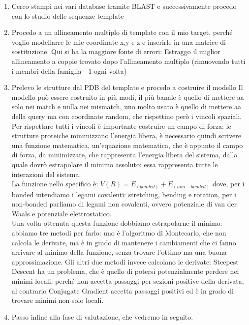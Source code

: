 \documentclass{article}
\begin{document}
\begin{enumerate}
    \item Cerco stampi nei vari database tramite BLAST e successivamente procedo con lo studio delle sequenze template
    \item Procedo a un allineamento multiplo di template con il mio target, perché voglio modellarre le mie coordinate x,y e z e inserirle in una matrice di sostituzione. Qui si ha la maggiore fonte di errori:
    Estraggo il miglior allineamento a coppie trovato dopo l'allineamento multiplo (rimuovendo tutti i membri della famiglia - 1 ogni volta)
    \item Prelevo le strutture dal PDB del template e procedo a costruire il modello
    Il modello può essere costruito in più modi, il più banale è quello di mettere aa solo nei match e nulla nei mismatch, uno molto usato è quello di mettere aa della query ma con coordinate random, che rispettino però i vincoli spaziali. Per rispettare tutti i vincoli è importante costruire un campo di forza: le strutture proteiche minimizzano l'energia libera, è necessario quindi scrivere una funzione matematica, un'equazione matematica, che è appunto il campo di forza, da minimizzare, che rappresenta l'energia libera del sistema, dalla quale dovrò estrapolare il minimo assoluto: essa rappresenta tutte le interazioni del sistema.\\
    La funzione nello specifico è:
    $V(R) = E_{(bonded)} + E_{(non-bonded)}$ dove, per i bonded intendiamo i legami covalenti: stretching, bending e rotation, per i non-bonded parliamo di legami non covalenti, ovvero potenziale di van der Waals e potenziale elettrostatico.\\
    Una volta ottenuta questa funzione dobbiamo estrapolarne il minimo: abbiamo tre metodi per farlo: uno è l'algoritmo di Montecarlo, che non calcola le derivate, ma è in grado di mantenere i cambiamenti che ci fanno arrivare al minimo della funzione, senza trovare l'ottimo ma una buona approssimazione. Gli altri due metodi invece calcolano le derivate: 
    Steepest Descent ha un problema, che è quello di potersi potenzialmente perdere nei minimi locali, perché non accetta passaggi per sezioni positive della derivata; al contrario Conjugate Gradient accetta passaggi positivi ed è in grado di trovare minimi non solo locali.
    \item Passo infine alla fase di valutazione, che vedremo in seguito.
\end{enumerate}
\end{document}
